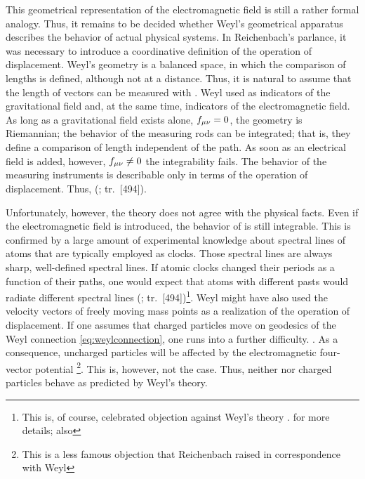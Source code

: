 \documentclass[submitted]{article}
\newcommand{\faradaymn}{\ensuremath{f\mn}}
\renewcommand{\rzlap}[2]{(\cite[#1]{Reichenbach1928}; tr.\ [#2])\xspace}
\begin{document}
This geometrical representation of the electromagnetic field is still a rather formal analogy. Thus, it remains to be decided whether Weyl's geometrical apparatus describes the behavior of actual physical systems. In Reichenbach's parlance, it was necessary to introduce a coordinative definition of the operation of displacement. Weyl's geometry is a balanced space, in which the comparison of lengths is defined, although not at a distance. Thus, it is natural to assume that the length of vectors can be measured with \rac. Weyl used \rac as indicators of the gravitational field and, at the same time, indicators of the electromagnetic field. As long as a gravitational field exists alone, $\faradaymn=0$, the geometry is Riemannian; the behavior of the measuring rods can be integrated; that is, they define a comparison of length independent of the path. As soon as an electrical field is added, however, $\faradaymn\neq 0$ the integrability fails. The behavior of the measuring instruments is describable only in terms of the operation of displacement. Thus,  \rzlap{354}{494}. 

Unfortunately, however, the theory does not agree with the physical facts. Even if the electromagnetic field is introduced, the behavior of \rac is still integrable. This is confirmed by a large amount of experimental knowledge about spectral lines of atoms that are typically employed as clocks. Those spectral lines are always sharp, well-defined spectral lines. If atomic clocks changed their periods as a function of their \st paths, one would expect that atoms with different pasts would radiate different spectral lines \rzlap{355}{494}\footnote{This is, of course, celebrated objection against Weyl's theory .  for more details; also }. Weyl might have also used the velocity vectors of freely moving mass points as a realization of the operation of displacement. If one assumes that charged particles move on geodesics of the Weyl connection \cref{eq:weylconnection}, one runs into a further difficulty. . As a consequence, uncharged particles will be affected by the electromagnetic four-vector potential \footnote{This is a less famous objection that Reichenbach raised in correspondence with Weyl }. This is, however, not the case. Thus, neither \rac nor charged particles behave as predicted by Weyl's theory. 
\end{document}
